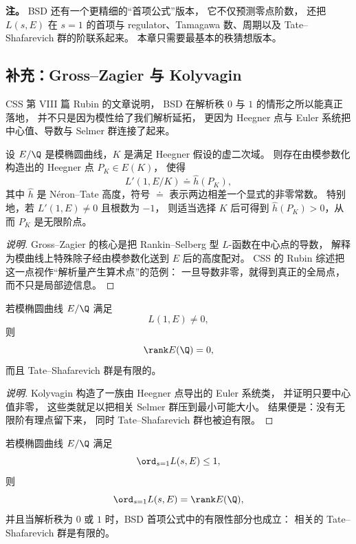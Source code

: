 \textbf{注。}
BSD 还有一个更精细的“首项公式”版本，
它不仅预测零点阶数，
还把 $L(s,E)$ 在 $s=1$ 的首项与 regulator、Tamagawa 数、周期以及 Tate--Shafarevich 群的阶联系起来。
本章只需要最基本的秩猜想版本。

\subsection*{补充：Gross--Zagier 与 Kolyvagin}
CSS 第 VIII 篇 Rubin 的文章说明，
BSD 在解析秩 $0$ 与 $1$ 的情形之所以能真正落地，
并不只是因为模性给了我们解析延拓，
更因为 Heegner 点与 Euler 系统把中心值、导数与 Selmer 群连接了起来。

\begin{theorem}
\label{thm:ch08-gross-zagier}
设 $E/\Q$ 是模椭圆曲线，$K$ 是满足 Heegner 假设的虚二次域。
则存在由模参数化构造出的 Heegner 点 $P_K\in E(K)$，
使得
\[
  L'(1,E/K)\doteq \hat h(P_K),
\]
其中 $\hat h$ 是 N\'eron--Tate 高度，符号 $\doteq$ 表示两边相差一个显式的非零常数。
特别地，若 $L'(1,E)\neq 0$ 且根数为 $-1$，
则适当选择 $K$ 后可得到 $\hat h(P_K)>0$，从而 $P_K$ 是无限阶点。
\end{theorem}

\begin{proof}[说明]
Gross--Zagier 的核心是把 Rankin--Selberg 型 $L$-函数在中心点的导数，
解释为模曲线上特殊除子经由模参数化送到 $E$ 后的高度配对。
CSS 的 Rubin 综述把这一点视作“解析量产生算术点”的范例：
一旦导数非零，就得到真正的全局点，而不只是局部迹信息。
\end{proof}

\begin{theorem}
\label{thm:ch08-kolyvagin-rank-zero}
若模椭圆曲线 $E/\Q$ 满足
\[
  L(1,E)\neq 0,
\]
则
\[
  \rank E(\Q)=0,
\]
而且 Tate--Shafarevich 群是有限的。
\end{theorem}

\begin{proof}[说明]
Kolyvagin 构造了一族由 Heegner 点导出的 Euler 系统类，
并证明只要中心值非零，
这些类就足以把相关 Selmer 群压到最小可能大小。
结果便是：没有无限阶有理点留下来，
同时 Tate--Shafarevich 群也被迫有限。
\end{proof}

\begin{theorem}
\label{thm:ch08-gz-kolyvagin}
若模椭圆曲线 $E/\Q$ 满足
\[
  \ord_{s=1}L(s,E)\le 1,
\]
则
\[
  \ord_{s=1}L(s,E)=\rank E(\Q),
\]
并且当解析秩为 $0$ 或 $1$ 时，BSD 首项公式中的有限性部分也成立：
相关的 Tate--Shafarevich 群是有限的。
\end{theorem}

